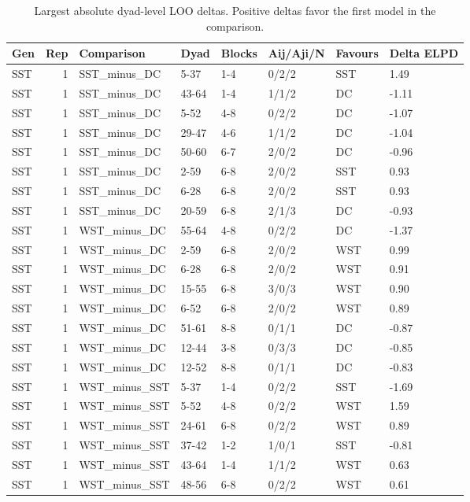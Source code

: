 \begin{table}[!h]
\centering
\caption{Largest absolute dyad-level LOO deltas. Positive deltas favor the first model in the comparison.}
\centering
\begin{tabular}[t]{lrllllll}
\toprule
Gen & Rep & Comparison & Dyad & Blocks & Aij/Aji/N & Favours & Delta ELPD\\
\midrule
SST & 1 & SST_minus_DC & 5-37 & 1-4 & 0/2/2 & SST & 1.49\\
SST & 1 & SST_minus_DC & 43-64 & 1-4 & 1/1/2 & DC & -1.11\\
SST & 1 & SST_minus_DC & 5-52 & 4-8 & 0/2/2 & DC & -1.07\\
SST & 1 & SST_minus_DC & 29-47 & 4-6 & 1/1/2 & DC & -1.04\\
SST & 1 & SST_minus_DC & 50-60 & 6-7 & 2/0/2 & DC & -0.96\\
\addlinespace
SST & 1 & SST_minus_DC & 2-59 & 6-8 & 2/0/2 & SST & 0.93\\
SST & 1 & SST_minus_DC & 6-28 & 6-8 & 2/0/2 & SST & 0.93\\
SST & 1 & SST_minus_DC & 20-59 & 6-8 & 2/1/3 & DC & -0.93\\
SST & 1 & WST_minus_DC & 55-64 & 4-8 & 0/2/2 & DC & -1.37\\
SST & 1 & WST_minus_DC & 2-59 & 6-8 & 2/0/2 & WST & 0.99\\
\addlinespace
SST & 1 & WST_minus_DC & 6-28 & 6-8 & 2/0/2 & WST & 0.91\\
SST & 1 & WST_minus_DC & 15-55 & 6-8 & 3/0/3 & WST & 0.90\\
SST & 1 & WST_minus_DC & 6-52 & 6-8 & 2/0/2 & WST & 0.89\\
SST & 1 & WST_minus_DC & 51-61 & 8-8 & 0/1/1 & DC & -0.87\\
SST & 1 & WST_minus_DC & 12-44 & 3-8 & 0/3/3 & DC & -0.85\\
\addlinespace
SST & 1 & WST_minus_DC & 12-52 & 8-8 & 0/1/1 & DC & -0.83\\
SST & 1 & WST_minus_SST & 5-37 & 1-4 & 0/2/2 & SST & -1.69\\
SST & 1 & WST_minus_SST & 5-52 & 4-8 & 0/2/2 & WST & 1.59\\
SST & 1 & WST_minus_SST & 24-61 & 6-8 & 0/2/2 & WST & 0.89\\
SST & 1 & WST_minus_SST & 37-42 & 1-2 & 1/0/1 & SST & -0.81\\
\addlinespace
SST & 1 & WST_minus_SST & 43-64 & 1-4 & 1/1/2 & WST & 0.63\\
SST & 1 & WST_minus_SST & 48-56 & 6-8 & 0/2/2 & WST & 0.61\\

\end{tabular}
\end{table}

